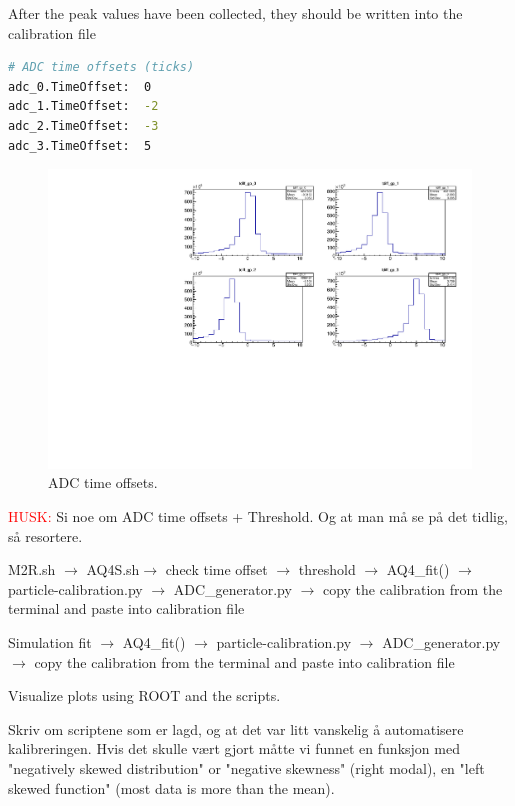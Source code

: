 \documentclass[twoside,english]{uiofysmaster/uiofysmaster}
\begin{document}
After the peak values have been collected, they should be written into the calibration file
\begin{lstlisting}[language=sh]
# ADC time offsets (ticks)
adc_0.TimeOffset:  0
adc_1.TimeOffset:  -2
adc_2.TimeOffset:  -3
adc_3.TimeOffset:  5
\end{lstlisting}

\begin{figure}[ht]
	\centering
	\includegraphics[width=\textwidth]{../Plots/plotting/tdiff_gp_0-3-user.pdf}
	\caption{ADC time offsets.}
	\label{fig:ADC_dt}
\end{figure}




\textcolor{red}{HUSK:} Si noe om ADC time offsets + Threshold. Og at man må se på det tidlig, så resortere.


M2R.sh $\rightarrow$ AQ4S.sh$\rightarrow$ check time offset $\rightarrow$ threshold $\rightarrow$ AQ4\_fit() $\rightarrow$ particle-calibration.py $\rightarrow$  ADC\_generator.py $\rightarrow$ copy the calibration from the terminal and paste into calibration file 


Simulation fit $\rightarrow$ AQ4\_fit() $\rightarrow$ particle-calibration.py $\rightarrow$  ADC\_generator.py $\rightarrow$ copy the calibration from the terminal and paste into calibration file 

Visualize plots using ROOT and the scripts. 



Skriv om scriptene som er lagd, og at det var litt vanskelig å automatisere kalibreringen. Hvis det skulle vært gjort måtte vi funnet en funksjon med "negatively skewed distribution" or "negative skewness" (right modal), en "left skewed function" (most data is more than the mean). 
\end{document}
